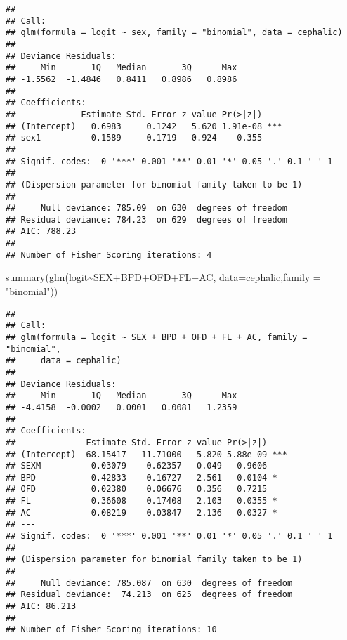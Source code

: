 \documentclass[
]{article}
\newenvironment{Shaded}{\begin{snugshade}}{\end{snugshade}}
\newcommand{\AttributeTok}[1]{\textcolor[rgb]{0.77,0.63,0.00}{#1}}
\newcommand{\FunctionTok}[1]{\textcolor[rgb]{0.00,0.00,0.00}{#1}}
\newcommand{\NormalTok}[1]{#1}
\newcommand{\SpecialCharTok}[1]{\textcolor[rgb]{0.00,0.00,0.00}{#1}}
\newcommand{\StringTok}[1]{\textcolor[rgb]{0.31,0.60,0.02}{#1}}
\begin{document}
\begin{verbatim}
## 
## Call:
## glm(formula = logit ~ sex, family = "binomial", data = cephalic)
## 
## Deviance Residuals: 
##     Min       1Q   Median       3Q      Max  
## -1.5562  -1.4846   0.8411   0.8986   0.8986  
## 
## Coefficients:
##             Estimate Std. Error z value Pr(>|z|)    
## (Intercept)   0.6983     0.1242   5.620 1.91e-08 ***
## sex1          0.1589     0.1719   0.924    0.355    
## ---
## Signif. codes:  0 '***' 0.001 '**' 0.01 '*' 0.05 '.' 0.1 ' ' 1
## 
## (Dispersion parameter for binomial family taken to be 1)
## 
##     Null deviance: 785.09  on 630  degrees of freedom
## Residual deviance: 784.23  on 629  degrees of freedom
## AIC: 788.23
## 
## Number of Fisher Scoring iterations: 4
\end{verbatim}

\begin{Shaded}
\begin{Highlighting}[]
\FunctionTok{summary}\NormalTok{(}\FunctionTok{glm}\NormalTok{(logit}\SpecialCharTok{\textasciitilde{}}\NormalTok{SEX}\SpecialCharTok{+}\NormalTok{BPD}\SpecialCharTok{+}\NormalTok{OFD}\SpecialCharTok{+}\NormalTok{FL}\SpecialCharTok{+}\NormalTok{AC, }\AttributeTok{data=}\NormalTok{cephalic,}\AttributeTok{family =} \StringTok{"binomial"}\NormalTok{))}
\end{Highlighting}
\end{Shaded}

\begin{verbatim}
## 
## Call:
## glm(formula = logit ~ SEX + BPD + OFD + FL + AC, family = "binomial", 
##     data = cephalic)
## 
## Deviance Residuals: 
##     Min       1Q   Median       3Q      Max  
## -4.4158  -0.0002   0.0001   0.0081   1.2359  
## 
## Coefficients:
##              Estimate Std. Error z value Pr(>|z|)    
## (Intercept) -68.15417   11.71000  -5.820 5.88e-09 ***
## SEXM         -0.03079    0.62357  -0.049   0.9606    
## BPD           0.42833    0.16727   2.561   0.0104 *  
## OFD           0.02380    0.06676   0.356   0.7215    
## FL            0.36608    0.17408   2.103   0.0355 *  
## AC            0.08219    0.03847   2.136   0.0327 *  
## ---
## Signif. codes:  0 '***' 0.001 '**' 0.01 '*' 0.05 '.' 0.1 ' ' 1
## 
## (Dispersion parameter for binomial family taken to be 1)
## 
##     Null deviance: 785.087  on 630  degrees of freedom
## Residual deviance:  74.213  on 625  degrees of freedom
## AIC: 86.213
## 
## Number of Fisher Scoring iterations: 10
\end{verbatim}
\end{document}
